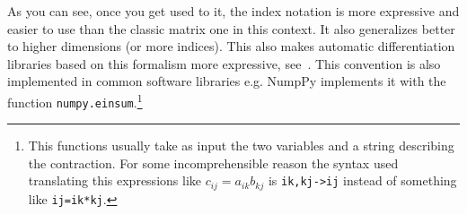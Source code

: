 \documentclass{article}
\begin{document}
As you can see, once you get used to it, the index notation is more expressive
and easier to use than the classic matrix one in this context. It also
generalizes better to higher dimensions (or more indices). This also makes
automatic differentiation libraries based on this formalism more expressive,
see~\cite{laue}. This convention is also implemented in common software
libraries e.g. NumpPy implements it with the function
\texttt{numpy.einsum}.\footnote{This functions usually take as input the two
variables and a string describing the contraction. For some incomprehensible
reason the syntax used translating this expressions like
\(c_{ij} = a_{ik} b_{kj}\) is \texttt{ik,kj->ij} instead of something like
\texttt{ij=ik*kj}.}





\end{document}
